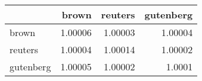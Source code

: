 \begin{tabular}{lrrr}
\hline
           &   brown &   reuters &   gutenberg \\
\hline
 brown     & 1.00006 &   1.00003 &     1.00004 \\
 reuters   & 1.00004 &   1.00014 &     1.00002 \\
 gutenberg & 1.00005 &   1.00002 &     1.0001  \\
\hline
\end{tabular}